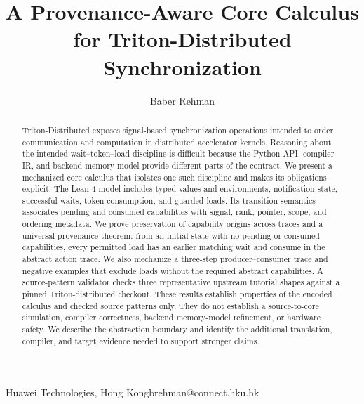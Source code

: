 \documentclass[a4paper,USenglish]{lipics-v2021}
\begin{document}
\title{A Provenance-Aware Core Calculus for Triton-Distributed Synchronization}

\author{Baber Rehman}{Huawei Technologies, Hong Kong}{brehman@connect.hku.hk}{}{}
\relatedversion{}

\maketitle

\begin{abstract}
Triton-Distributed exposes signal-based synchronization operations intended to order communication and computation in distributed accelerator kernels. Reasoning about the intended wait--token--load discipline is difficult because the Python API, compiler IR, and backend memory model provide different parts of the contract. We present a mechanized core calculus that isolates one such discipline and makes its obligations explicit. The Lean 4 model includes typed values and environments, notification state, successful waits, token consumption, and guarded loads. Its transition semantics associates pending and consumed capabilities with signal, rank, pointer, scope, and ordering metadata. We prove preservation of capability origins across traces and a universal provenance theorem: from an initial state with no pending or consumed capabilities, every permitted load has an earlier matching wait and consume in the abstract action trace. We also mechanize a three-step producer--consumer trace and negative examples that exclude loads without the required abstract capabilities. A source-pattern validator checks three representative upstream tutorial shapes against a pinned Triton-distributed checkout. These results establish properties of the encoded calculus and checked source patterns only. They do not establish a source-to-core simulation, compiler correctness, backend memory-model refinement, or hardware safety. We describe the abstraction boundary and identify the additional translation, compiler, and target evidence needed to support stronger claims.
\end{abstract}
\end{document}
